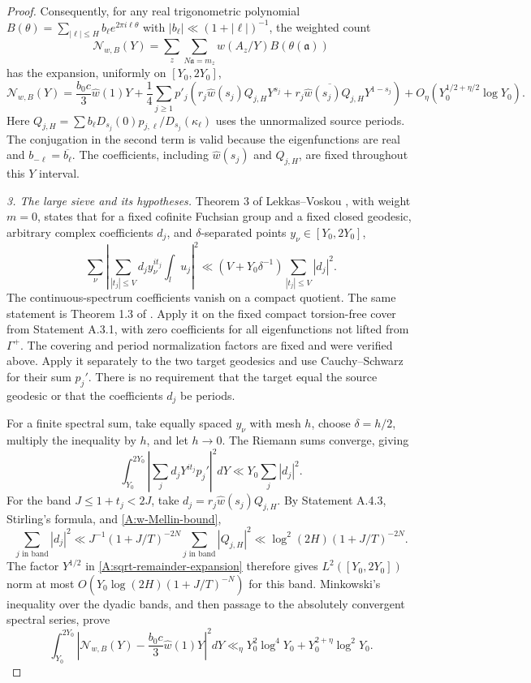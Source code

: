 \begin{proof}
Consequently, for any real trigonometric polynomial
$B(\theta)=\sum_{|\ell|\leq H}b_\ell e^{2\pi i\ell\theta}$
with $|b_\ell|\ll(1+|\ell|)^{-1}$, the weighted count
\[
 \mathcal N_{w,B}(Y)=\sum_z\sum_{N\mathfrak a=m_z}
                  w(A_z/Y)B(\theta(\mathfrak a))
\]
has the expansion, uniformly on $[Y_0,2Y_0]$,
\begin{equation}\label{A:sqrt-remainder-expansion}
 \mathcal N_{w,B}(Y)=\frac{b_0c}{3}\widehat w(1)Y
 +\frac14\sum_{j\geq1}p'_j
  \left(r_j\widehat w(s_j)Q_{j,H}Y^{s_j}
       +\overline{r_j\widehat w(s_j)Q_{j,H}}Y^{1-s_j}\right)
 +O_\eta\left(Y_0^{1/2+\eta/2}\log Y_0\right).
\end{equation}
Here $Q_{j,H}=\sum b_\ell D_{s_j}(0)
p_{j,\ell}/D_{s_j}(\kappa_\ell)$ uses the unnormalized source
periods. The conjugation in the second term is valid because
the eigenfunctions are real and $b_{-\ell}=\overline{b_\ell}$.
The coefficients, including $\widehat w(s_j)$ and $Q_{j,H}$,
are fixed throughout this $Y$ interval.

\emph{3. The large sieve and its hypotheses.}
Theorem 3 of Lekkas--Voskou \cite{LekkasVoskou2024}, with weight
$m=0$, states that for a fixed cofinite Fuchsian group and a
fixed closed geodesic, arbitrary complex coefficients $d_j$, and
$\delta$-separated points $y_\nu\in[Y_0,2Y_0]$,
\[
 \sum_\nu\left|\sum_{|t_j|\leq V}d_jy_\nu^{it_j}
                    \int_lu_j\right|^2
 \ll (V+Y_0\delta^{-1})\sum_{|t_j|\leq V}|d_j|^2.
\]
The continuous-spectrum coefficients vanish on a compact quotient.
The same statement is Theorem 1.3 of \cite{LekkasPetridis2026}.
Apply it on the fixed compact torsion-free cover from Statement A.3.1,
with zero coefficients for all eigenfunctions not lifted from
$\Gamma^+$. The covering and period normalization factors are
fixed and were verified above. Apply it separately to the two
target geodesics and use Cauchy--Schwarz for their sum $p_j'$.
There is no requirement that the target equal the source geodesic
or that the coefficients $d_j$ be periods.

For a finite spectral sum, take equally spaced $y_\nu$ with
mesh $h$, choose $\delta=h/2$, multiply the inequality by $h$,
and let $h\to0$. The Riemann sums converge, giving
\begin{equation}\label{A:continuous-large-sieve}
 \int_{Y_0}^{2Y_0}
       \left|\sum_jd_jY^{it_j}p_j'\right|^2dY
       \ll Y_0\sum_j|d_j|^2.
\end{equation}
For the band $J\leq1+t_j<2J$, take
$d_j=r_j\widehat w(s_j)Q_{j,H}$.
By Statement A.4.3, Stirling's formula, and
\eqref{A:w-Mellin-bound},
\[
 \sum_{j\text{ in band}}|d_j|^2
 \ll J^{-1}(1+J/T)^{-2N}\sum_{j\text{ in band}}|Q_{j,H}|^2
 \ll\log^2(2H)(1+J/T)^{-2N}.
\]
The factor $Y^{1/2}$ in \eqref{A:sqrt-remainder-expansion}
therefore gives $L^2([Y_0,2Y_0])$ norm at most
$O(Y_0\log(2H)(1+J/T)^{-N})$ for this band.
Minkowski's inequality over the dyadic bands, and then passage
to the absolutely convergent spectral series, prove
\begin{equation}\label{A:smoothed-mean-square}
 \int_{Y_0}^{2Y_0}
 \left|\mathcal N_{w,B}(Y)-\frac{b_0c}{3}\widehat w(1)Y\right|^2dY
 \ll_\eta Y_0^2\log^4Y_0+Y_0^{2+\eta}\log^2Y_0.
\end{equation}


\end{proof}
